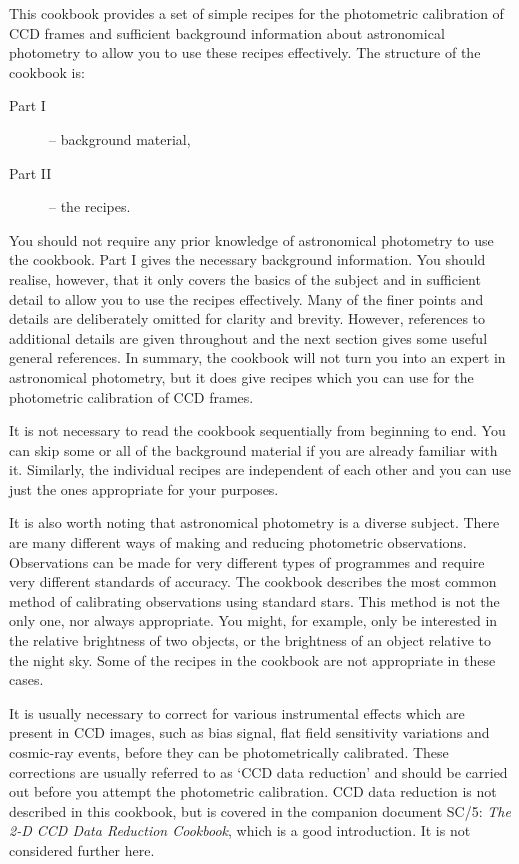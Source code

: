 \documentclass[twoside,11pt]{article}
\newcommand{\xref}[3]{#1}
\begin{document}
This cookbook provides a set of simple recipes for the photometric
calibration of CCD frames and sufficient background information about
astronomical photometry to allow you to use these recipes effectively.
The structure of the cookbook is:

\begin{description}

  \item[{\rm Part I}] -- background material,

  \item[{\rm Part II}] -- the recipes.

\end{description}

You should not require any prior knowledge of astronomical photometry
to use the cookbook.  Part I gives the necessary background information.
You should realise, however, that it only covers the basics of the
subject and in sufficient detail to allow you to use the recipes
effectively.  Many of the finer points and details are deliberately
omitted for clarity and brevity.  However, references to additional
details are given throughout and the next section gives some useful
general references.  In summary, the cookbook will not turn you into
an expert in astronomical photometry, but it does give recipes which
you can use for the photometric calibration of CCD frames.

It is not necessary to read the cookbook sequentially from beginning
to end.  You can skip some or all of the background material if you
are already familiar with it.  Similarly, the individual recipes are
independent of each other and you can use just the ones appropriate for
your purposes.

It is also worth noting that astronomical photometry is a diverse
subject.  There are many different ways of making and reducing
photometric observations.  Observations can be made for very different
types of programmes and require very different standards of accuracy.
The cookbook describes the most common method of calibrating observations
using standard stars.  This method is not the only one, nor always
appropriate.  You might, for example, only be interested in the
relative brightness of two objects, or the brightness of an object
relative to the night sky.  Some of the recipes in the cookbook are not
appropriate in these cases.

It is usually necessary to correct for various instrumental effects
which are present in CCD images, such as bias signal, flat field sensitivity
variations and cosmic-ray events, before they can be photometrically
calibrated.  These corrections are usually referred to as `CCD data
reduction' and should be carried out before you attempt the photometric
calibration.  CCD data reduction is not described in this cookbook, but is
covered in the companion document \xref{SC/5: {\it The 2-D CCD Data
Reduction Cookbook}}{sc5}{}\/\cite{SC5}, which is a good introduction.
It is not considered further here.
\end{document}

